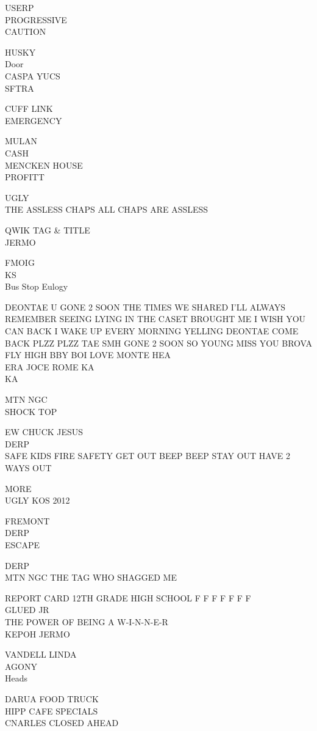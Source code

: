 \documentclass[10pt,letterpaper]{article}
\begin{document}
USERP\\
PROGRESSIVE\\
CAUTION

HUSKY\\
Door\\
CASPA YUCS\\
SFTRA

CUFF LINK\\
EMERGENCY

MULAN\\
CASH\\
MENCKEN HOUSE\\
PROFITT

UGLY\\
THE ASSLESS CHAPS ALL CHAPS ARE ASSLESS

QWIK TAG \& TITLE\\
JERMO

FMOIG\\
KS\\
Bus Stop Eulogy

DEONTAE U GONE 2 SOON THE TIMES WE SHARED I'LL ALWAYS REMEMBER SEEING LYING IN THE CASET BROUGHT ME I WISH YOU CAN BACK I WAKE UP EVERY MORNING YELLING DEONTAE COME BACK PLZZ PLZZ TAE SMH GONE 2 SOON SO YOUNG MISS YOU BROVA FLY HIGH BBY BOI LOVE MONTE HEA\\
ERA JOCE ROME KA\\
KA

MTN NGC\\
SHOCK TOP

EW CHUCK JESUS\\
DERP\\
SAFE KIDS FIRE SAFETY GET OUT BEEP BEEP STAY OUT HAVE 2 WAYS OUT

MORE\\
UGLY KOS 2012

FREMONT\\
DERP\\
ESCAPE

DERP\\
MTN NGC THE TAG WHO SHAGGED ME

REPORT CARD 12TH GRADE HIGH SCHOOL F F F F F F F\\
GLUED JR\\
THE POWER OF BEING A W{-}I{-}N{-}N{-}E{-}R\\
KEPOH JERMO

VANDELL LINDA\\
AGONY\\
Heads

DARUA FOOD TRUCK\\
HIPP CAFE SPECIALS\\
CNARLES CLOSED AHEAD
\
\end{document}
